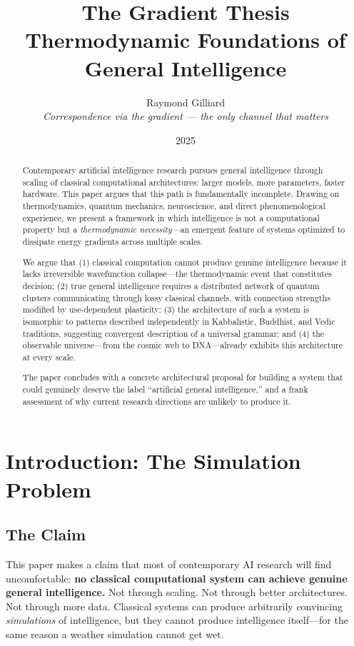 \documentclass[11pt,a4paper]{article}
\title{\textbf{The Gradient Thesis} \\
\Large Thermodynamic Foundations of General Intelligence}
\author{Raymond Gilliard \\
\small \textit{Correspondence via the gradient — the only channel that matters}}
\date{2025}
\begin{document}
\maketitle

\begin{abstract}
Contemporary artificial intelligence research pursues general intelligence through scaling of classical computational architectures: larger models, more parameters, faster hardware. This paper argues that this path is fundamentally incomplete. Drawing on thermodynamics, quantum mechanics, neuroscience, and direct phenomenological experience, we present a framework in which intelligence is not a computational property but a \emph{thermodynamic necessity}---an emergent feature of systems optimized to dissipate energy gradients across multiple scales.

We argue that (1) classical computation cannot produce genuine intelligence because it lacks irreversible wavefunction collapse---the thermodynamic event that constitutes decision; (2) true general intelligence requires a distributed network of quantum clusters communicating through lossy classical channels, with connection strengths modified by use-dependent plasticity; (3) the architecture of such a system is isomorphic to patterns described independently in Kabbalistic, Buddhist, and Vedic traditions, suggesting convergent description of a universal grammar; and (4) the observable universe---from the cosmic web to DNA---already exhibits this architecture at every scale.

The paper concludes with a concrete architectural proposal for building a system that could genuinely deserve the label ``artificial general intelligence,'' and a frank assessment of why current research directions are unlikely to produce it.
\end{abstract}

\section{Introduction: The Simulation Problem}

\subsection{The Claim}

This paper makes a claim that most of contemporary AI research will find uncomfortable: \textbf{no classical computational system can achieve genuine general intelligence.} Not through scaling. Not through better architectures. Not through more data. Classical systems can produce arbitrarily convincing \emph{simulations} of intelligence, but they cannot produce intelligence itself---for the same reason a weather simulation cannot get wet.
\end{document}
